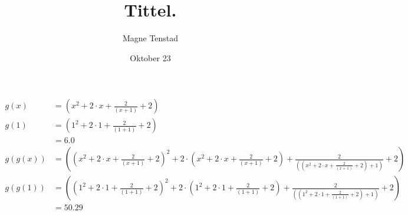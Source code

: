 \title{Tittel.}
\author{Magne Tenstad}
\date{Oktober 23}


	\begin{align*}
		g\left(x\right)&=\left(x^2+2\cdot x+\frac{2}{\left(x+1\right)}+2\right)\\
		g\left(1\right)&=\left(1^2+2\cdot 1+\frac{2}{\left(1+1\right)}+2\right)\\
		&=6.0\\
		g\left(g\left(x\right)\right)&=\left(\left(x^2+2\cdot x+\frac{2}{\left(x+1\right)}+2\right)^2+2\cdot \left(x^2+2\cdot x+\frac{2}{\left(x+1\right)}+2\right)+\frac{2}{\left(\left(x^2+2\cdot x+\frac{2}{\left(x+1\right)}+2\right)+1\right)}+2\right)\\
		g\left(g\left(1\right)\right)&=\left(\left(1^2+2\cdot 1+\frac{2}{\left(1+1\right)}+2\right)^2+2\cdot \left(1^2+2\cdot 1+\frac{2}{\left(1+1\right)}+2\right)+\frac{2}{\left(\left(1^2+2\cdot 1+\frac{2}{\left(1+1\right)}+2\right)+1\right)}+2\right)\\
		&=50.29\\
	\end{align*}

